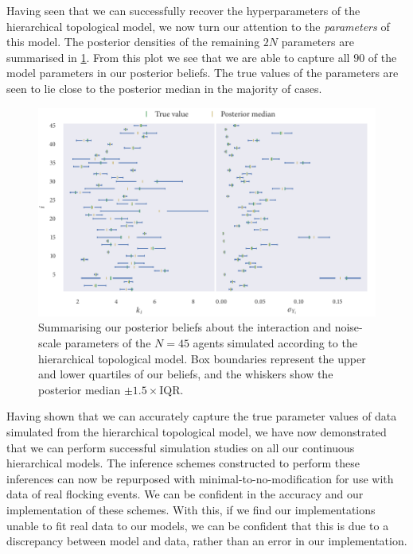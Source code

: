 Having seen that we can successfully recover the hyperparameters of the
hierarchical topological model, we now turn our attention to the
\emph{parameters} of this model. The posterior densities of the remaining $2N$
parameters are summarised in \cref{fig:top_hier_summary}. From this plot we see
that we are able to capture all $90$ of the model parameters in our posterior
beliefs. The true values of the parameters are seen to lie close to the
posterior median in the majority of cases.

\begin{figure}[tbp]
  \includegraphics{top_hier_summary.pdf}
  \caption{Summarising our posterior beliefs about the interaction and
    noise-scale parameters of the $N=45$ agents simulated according to the
    hierarchical topological model. Box boundaries represent the upper and
    lower quartiles of our beliefs, and the whiskers show the posterior
    median $\pm1.5\times\text{IQR}$.}
  \label{fig:top_hier_summary}
\end{figure}

Having shown that we can accurately capture the true parameter values of data
simulated from the hierarchical topological model, we have now demonstrated
that we can perform successful simulation studies on all our continuous
hierarchical models. The inference schemes constructed to perform these
inferences can now be repurposed with minimal-to-no-modification for use with
data of real flocking events. We can be confident in the accuracy and our
implementation of these schemes. With this, if we find our implementations
unable to fit real data to our models, we can be confident that this is due to
a discrepancy between model and data, rather than an error in our
implementation.


